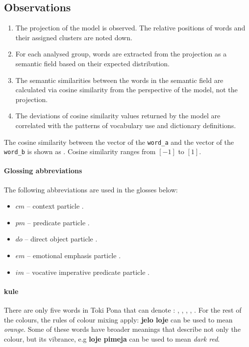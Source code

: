 \documentclass[14pt, a4paper]{extreport}
\begin{document}
    \subsection{Observations}
\begin{enumerate}
  \item The projection of the model is observed. The relative positions of words and their assigned clusters are noted down.
  \item For each analysed group, words are extracted from the projection as a semantic field based on their expected distribution.
  \item The semantic similarities between the words in the semantic field are calculated via cosine similarity from the perspective of the model, not the projection.
  \item The deviations of cosine similarity values returned by the model are correlated with the patterns of vocabulary use and dictionary definitions.
\end{enumerate}

    The cosine similarity between the vector of the \texttt{word_a} and the vector of the \texttt{word_b} is shown as . Cosine similarity ranges from \([-1]\) to \([1]\).
        \paragraph{Glossing abbreviations}
The following abbreviations are used in the glosses below:

\begin{itemize}
  \item $cm$ -- context particle .
  \item $pm$ -- predicate particle .
  \item $do$ -- direct object particle .
  \item $em$ -- emotional emphasis particle .
  \item $im$ -- vocative imperative predicate particle .
\end{itemize}
        \paragraph{kule}
There are only five words in Toki Pona that can denote : , , , , . For the rest of the colours, the rules of colour mixing apply: \textbf{jelo loje} can be used to mean \textit{orange}. Some of these words have broader meanings that describe not only the colour, but its vibrance, e.g \textbf{loje pimeja} can be used to mean \textit{dark red}.
\end{document}
